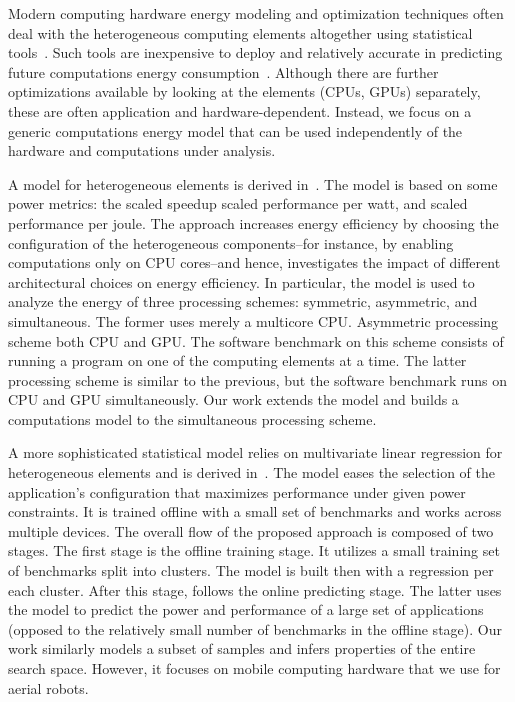 Modern computing hardware energy modeling and optimization techniques often deal with the heterogeneous computing elements altogether using statistical tools~\citep{teamplay}. Such tools are inexpensive to deploy and relatively accurate in predicting future computations energy consumption~\citep{seewald2019coarse}. Although there are further optimizations available by looking at the elements (CPUs, GPUs) separately, these are often application and hardware-dependent. Instead, we focus on a generic computations energy model that can be used independently of the hardware and computations under analysis. 

A model for heterogeneous elements is derived in~\citep{marowka2017energy}. The model is based on some power metrics: the scaled speedup scaled performance per watt, and scaled performance per joule. The approach increases energy efficiency by choosing the configuration of the heterogeneous components--for instance, by enabling computations only on CPU cores--and hence, investigates the impact of different architectural choices on energy efficiency. In particular, the model is used to analyze the energy of three processing schemes: symmetric, asymmetric, and simultaneous. The former uses merely a multicore CPU. Asymmetric processing scheme both CPU and GPU. The software benchmark on this scheme consists of running a program on one of the computing elements at a time. The latter processing scheme is similar to the previous, but the software benchmark runs on CPU and GPU simultaneously. Our work extends the model and builds a computations model to the simultaneous processing scheme.

A more sophisticated statistical model relies on multivariate linear regression for heterogeneous elements and is derived in~\citep{bailey2014adaptive}. The model eases the selection of the application's configuration that maximizes performance under given power constraints. It is trained offline with a small set of benchmarks and works across multiple devices. The overall flow of the proposed approach is composed of two stages. The first stage is the offline training stage. It utilizes a small training set of benchmarks split into clusters. The model is built then with a regression per each cluster. After this stage, follows the online predicting stage. The latter uses the model to predict the power and performance of a large set of applications (opposed to the relatively small number of benchmarks in the offline stage). Our work similarly models a subset of samples and infers properties of the entire search space. However, it focuses on mobile computing hardware that we use for aerial robots.

